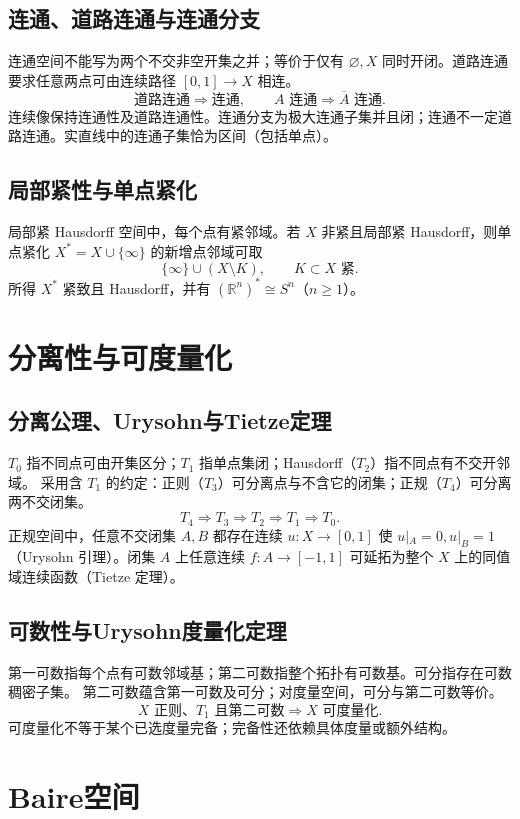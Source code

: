 \documentclass[../main.tex]{subfiles}
\begin{document}
\subsection{连通、道路连通与连通分支}
连通空间不能写为两个不交非空开集之并；等价于仅有 $\varnothing,X$ 同时开闭。道路连通要求任意两点可由连续路径 $[0,1]\to X$ 相连。
\[
\text{道路连通}\Longrightarrow\text{连通},\qquad
A\text{ 连通}\Longrightarrow\overline A\text{ 连通}.
\]
连续像保持连通性及道路连通性。连通分支为极大连通子集并且闭；连通不一定道路连通。实直线中的连通子集恰为区间（包括单点）。
\subsection{局部紧性与单点紧化}
局部紧 Hausdorff 空间中，每个点有紧邻域。若 $X$ 非紧且局部紧 Hausdorff，则单点紧化 $X^*=X\cup\{\infty\}$ 的新增点邻域可取
\[
\{\infty\}\cup(X\setminus K),\qquad K\subset X\text{ 紧}.
\]
所得 $X^*$ 紧致且 Hausdorff，并有 $(\mathbb R^n)^*\cong S^n$（$n\ge1$）。
\section{分离性与可度量化}
\subsection{分离公理、Urysohn与Tietze定理}
$T_0$ 指不同点可由开集区分；$T_1$ 指单点集闭；Hausdorff（$T_2$）指不同点有不交开邻域。
采用含 $T_1$ 的约定：正则（$T_3$）可分离点与不含它的闭集；正规（$T_4$）可分离两不交闭集。
\[
T_4\Longrightarrow T_3\Longrightarrow T_2\Longrightarrow T_1\Longrightarrow T_0.
\]
正规空间中，任意不交闭集 $A,B$ 都存在连续 $u:X\to[0,1]$ 使 $u|_A=0,u|_B=1$（Urysohn 引理）。闭集 $A$ 上任意连续 $f:A\to[-1,1]$ 可延拓为整个 $X$ 上的同值域连续函数（Tietze 定理）。
\subsection{可数性与Urysohn度量化定理}
第一可数指每个点有可数邻域基；第二可数指整个拓扑有可数基。可分指存在可数稠密子集。
第二可数蕴含第一可数及可分；对度量空间，可分与第二可数等价。
\[
X\text{ 正则、}T_1\text{ 且第二可数}\Longrightarrow X\text{ 可度量化}.
\]
可度量化不等于某个已选度量完备；完备性还依赖具体度量或额外结构。
\section{Baire空间}
\end{document}
